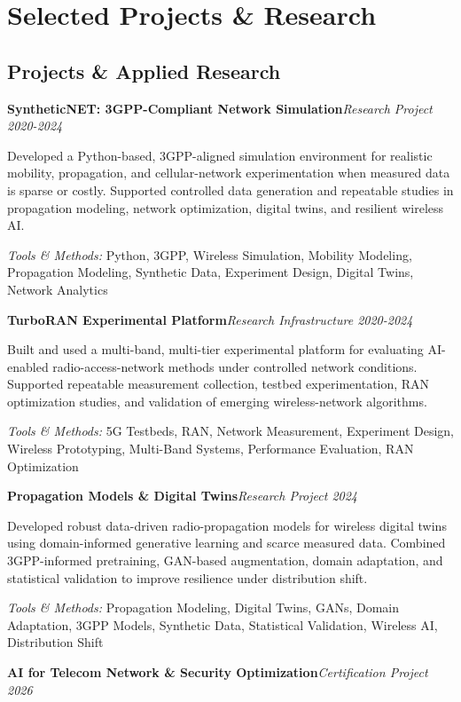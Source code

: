 \documentclass[9pt,letterpaper]{extarticle}
\newcommand{\entry}[2]{\Needspace{4\baselineskip}\textbf{#1}\hfill\textit{#2}\par}
\begin{document}
\section{Selected Projects \& Research}
\subsection{Projects \& Applied Research}
\entry{SyntheticNET: 3GPP-Compliant Network Simulation}{Research Project \textbar{} 2020-2024}
Developed a Python-based, 3GPP-aligned simulation environment for realistic mobility, propagation, and cellular-network experimentation when measured data is sparse or costly. Supported controlled data generation and repeatable studies in propagation modeling, network optimization, digital twins, and resilient wireless AI.\par
{\small\textit{Tools \& Methods:} Python, 3GPP, Wireless Simulation, Mobility Modeling, Propagation Modeling, Synthetic Data, Experiment Design, Digital Twins, Network Analytics\par}
\vspace{1pt}
\entry{TurboRAN Experimental Platform}{Research Infrastructure \textbar{} 2020-2024}
Built and used a multi-band, multi-tier experimental platform for evaluating AI-enabled radio-access-network methods under controlled network conditions. Supported repeatable measurement collection, testbed experimentation, RAN optimization studies, and validation of emerging wireless-network algorithms.\par
{\small\textit{Tools \& Methods:} 5G Testbeds, RAN, Network Measurement, Experiment Design, Wireless Prototyping, Multi-Band Systems, Performance Evaluation, RAN Optimization\par}
\vspace{1pt}
\entry{Propagation Models \& Digital Twins}{Research Project \textbar{} 2024}
Developed robust data-driven radio-propagation models for wireless digital twins using domain-informed generative learning and scarce measured data. Combined 3GPP-informed pretraining, GAN-based augmentation, domain adaptation, and statistical validation to improve resilience under distribution shift.\par
{\small\textit{Tools \& Methods:} Propagation Modeling, Digital Twins, GANs, Domain Adaptation, 3GPP Models, Synthetic Data, Statistical Validation, Wireless AI, Distribution Shift\par}
\vspace{1pt}
\entry{AI for Telecom Network \& Security Optimization}{Certification Project \textbar{} 2026}
\end{document}
